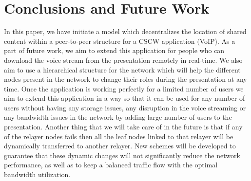 \section{Conclusions and Future Work} 
In this paper, we have initiate a model which decentralizes the location of 
shared content within a peer-to-peer structure for a CSCW application (VoIP). 
As a part of future work, we aim to extend this application for people who can 
download the voice stream from the presentation remotely in real-time. We also 
aim to use a hierarchical structure for the network which will help the 
different nodes present in the network to change their roles during the 
presentation at any time. Once the application is working perfectly for a 
limited number of users we aim to extend this application in a way so that it 
can be used for any number of users without having any storage issues, any 
disruption in the voice streaming or any bandwidth issues in the network by 
adding large number of users to the presentation. Another thing that we will 
take care of in the future is that if any of the relayer nodes fails then all 
the leaf nodes linked to that relayer will be dynamically transferred to 
another relayer. New schemes will be developed to guarantee that these dynamic 
changes will not significantly reduce the network performance, as well as to 
keep a balanced traffic flow with the optimal bandwidth utilization.